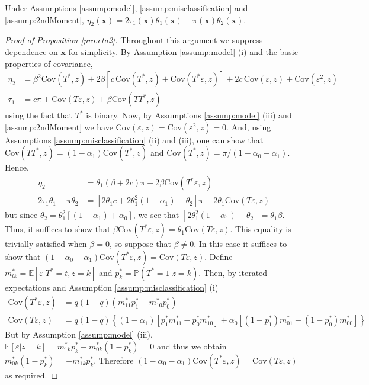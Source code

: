 \documentclass[12pt]{article}
\begin{document}
\begin{pro}
  Under Assumptions \ref{assump:model}, \ref{assump:misclassification} and \ref{assump:2ndMoment}, $\eta_2(\mathbf{x}) =  2\tau_1(\mathbf{x}) \theta_1(\mathbf{x}) - \pi(\mathbf{x})\theta_2(\mathbf{x})$.
  \label{pro:eta2}
\end{pro}
\begin{proof}[Proof of Proposition \ref{pro:eta2}]
  Throughout this argument we suppress dependence on $\mathbf{x}$ for simplicity. 
  By Assumption \ref{assump:model} (i) and the basic properties of covariance, 
\begin{align*}
    \eta_2 &= \beta^2 \mbox{Cov}(T^*,z) + 2 \beta\left[ c\, \mbox{Cov}(T^*,z) + \mbox{Cov}(T^*\varepsilon,z)  \right] + 2c \, \mbox{Cov}(\varepsilon,z) + \mbox{Cov}(\varepsilon^2,z)\\
  \tau_1 &= c \pi + \mbox{Cov}(T\varepsilon,z) + \beta \mbox{Cov}(TT^*,z)
\end{align*}
using the fact that $T^*$ is binary. 
Now, by Assumptions \ref{assump:model} (iii) and \ref{assump:2ndMoment} we have $\mbox{Cov}(\varepsilon,z) = \mbox{Cov}(\varepsilon^2,z) = 0$.
And, using Assumptions \ref{assump:misclassification} (ii) and (iii), one can show that $\mbox{Cov}(TT^*,z) = (1 - \alpha_1)\mbox{Cov}(T^*,z)$ and $\mbox{Cov}(T^*,z) = \pi/(1 - \alpha_0 - \alpha_1)$.
Hence, 
\begin{align*}
  \eta_2 &= \theta_1\left( \beta 
+ 2 c \right) \pi + 2\beta \mbox{Cov}(T^*\varepsilon,z) \\
  2 \tau_1 \theta_1 - \pi \theta_2 &= \left[2\theta_1 c + 2 \theta_1^2 (1 - \alpha_1) - \theta_2\right]\pi + 2\theta_1 \mbox{Cov}(T\varepsilon,z) 
\end{align*}
but since $\theta_2 = \theta_1^2 \left[ (1 - \alpha_1) + \alpha_0 \right]$, we see that $[2\theta_1^2(1 - \alpha_1) - \theta_2] = \theta_1 \beta$.
Thus, it suffices to show that $\beta \mbox{Cov}(T^*\varepsilon,z) = \theta_1 \mbox{Cov}(T\varepsilon,z)$.
This equality is trivially satisfied when $\beta=0$, so suppose that $\beta \neq 0$. 
In this case it suffices to show that $(1 - \alpha_0 - \alpha_1) \mbox{Cov}(T^*\varepsilon,z) = \mbox{Cov}(T\varepsilon,z)$.
Define $m^*_{tk} = \mathbb{E}\left[ \varepsilon|T^*=t,z=k \right]$ and $p^*_k = \mathbb{P}(T^*=1|z=k)$.
Then, by iterated expectations and Assumption \ref{assump:misclassification} (i)
\begin{align*}
  \mbox{Cov}(T^*\varepsilon,z) &=q(1 - q)\left(m_{11}^* p_1^* - m_{10}^* p_0^*  \right) \\
  \mbox{Cov}(T\varepsilon,z) &= q(1 - q)\left\{ (1 - \alpha_1)\left[ p_1^* m_{11}^* - p_0^* m_{10}^* \right] + \alpha_0\left[ (1 - p_1^*) m_{01}^* - (1 - p_0^*)m_{00}^* \right] \right\} 
\end{align*}
But by Assumption \ref{assump:model} (iii), $\mathbb{E}[\varepsilon|z=k] = m_{1k}^*p_{k}^* + m_{0k}^*(1 - p_k^*)=0$ and thus we obtain $m_{0k}^*(1 - p_k^*)= - m_{1k}^* p_k^*$.
Therefore  $(1 - \alpha_0 - \alpha_1) \mbox{Cov}(T^*\varepsilon,z) = \mbox{Cov}(T\varepsilon,z)$ as required.
\end{proof}
  
\end{document}

